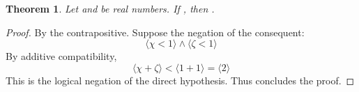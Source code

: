 \documentclass[preview]{standalone}
\newtheorem{theorem}{Theorem}
\begin{document}
\begin{theorem} %
    Let \bm{$\chi$} and \bm{$\zeta$} be real numbers. 
    If , 
    then 
    \bm{$
        \big \langle \chi \ge 1 \big \rangle 
            \lor
        \big \langle \zeta \ge 1 \big \rangle
    $}.
\end{theorem}

\begin{proof}
    By the contrapositive.
    Suppose the negation of the consequent: 
    \begin{equation*}
        \big \langle \chi < 1 \big \rangle 
            \land 
        \big \langle \zeta < 1 \big \rangle    
    \end{equation*}    
    By additive compatibility,
    \begin{equation*}
        \Big \langle \chi + \zeta \Big \rangle 
            < 
        \Big \langle 1 + 1 \Big \rangle 
            = 
        \Big \langle 
            2
        \Big \rangle
    \end{equation*}
    This is the logical negation of the direct hypothesis. Thus concludes the proof.
\end{proof}
\end{document}

